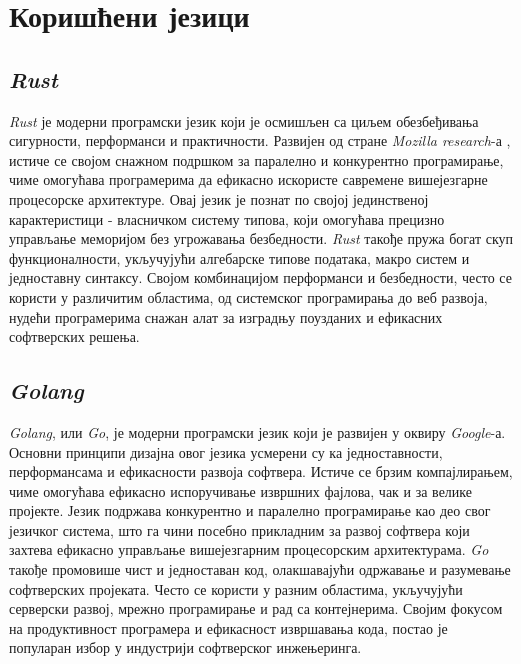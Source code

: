 \section{Коришћени језици}

\subsection{\textit{Rust}}
 \textit{Rust} је модерни програмски језик који је осмишљен са циљем обезбеђивања сигурности, перформанси и практичности. Развијен од стране \textit{Mozilla research}-а \cite{mozillaResearch}, истиче се својом снажном подршком за паралелно и конкурентно програмирање, чиме омогућава програмерима да ефикасно искористе савремене вишејезгарне процесорске архитектуре. Овај језик је познат по својој јединственој карактеристици - власничком систему типова, који омогућава прецизно управљање меморијом без угрожавања безбедности. \textit{Rust} такође пружа богат скуп функционалности, укључујући алгебарске типове података, макро систем и једноставну синтаксу. Својом комбинацијом перформанси и безбедности, често се користи у различитим областима, од системског програмирања до веб развоја, нудећи програмерима снажан алат за изградњу поузданих и ефикасних софтверских решења.
 
\subsection{\textit{Golang}}
 \textit{Golang}, или \textit{Go}, је модерни програмски језик који је развијен у оквиру \textit{Google}-а. Основни принципи дизајна овог језика усмерени су ка једноставности, перформансама и ефикасности развоја софтвера. Истиче се брзим компајлирањем, чиме омогућава ефикасно испоручивање извршних фајлова, чак и за велике пројекте. Језик подржава конкурентно и паралелно програмирање као део свог језичког система, што га чини посебно прикладним за развој софтвера који захтева ефикасно управљање вишејезгарним процесорским архитектурама. \textit{Go} такође промовише чист и једноставан код, олакшавајући одржавање и разумевање софтверских пројеката. Често се користи у разним областима, укључујући серверски развој, мрежно програмирање и рад са контејнерима. Својим фокусом на продуктивност програмера и ефикасност извршавања кода, постао је популаран избор у индустрији софтверског инжењеринга.